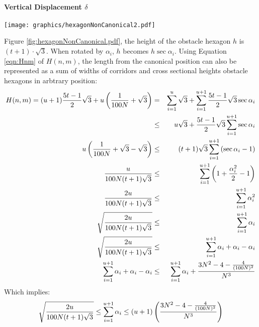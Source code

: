 \paragraph{Vertical Displacement $\delta$}
\begin{minipage}{\linewidth}
\begin{center}
\texttt{[image: graphics/hexagonNonCanonical2.pdf]}
\label{fig:hexagonNonCanonical.pdf}
\end{center}
\end{minipage}

Figure \ref{fig:hexagonNonCanonical.pdf}, the height of the obstacle hexagon $h$ is $(t+1) \cdot \sqrt{3}$.  
When rotated by $\alpha_i$, $h$ becomes $h \sec \alpha_i$.
Using Equation \ref{eqn:Hnm} of $H(n,m)$, the length from the canonical position can also be represented as a sum of widths of corridors and cross sectional heights obstacle hexagons in arbtrary position:
\begin{eqnarray*}
H(n,m) = (u+1) \frac{5t-1}{2} \sqrt{3} + u \left( \frac{1}{100N} + \sqrt{3} \right)&=& \sum_{i=1}^{u} \sqrt{3} + \sum_{i=1}^{u+1} \frac{5t-1}{2}\sqrt{3} \sec \alpha_i \\ 
&\leq& u \sqrt{3} + \frac{5t-1}{2} \sqrt{3} \sum_{i = 1}^{u+1} \sec \alpha_i\\
u \left( \frac{1}{100N} + \sqrt{3} - \sqrt{3}  \right) &\leq&(t+1) \sqrt{3}    \sum_{i = 1}^{u+1}  \left( \sec \alpha_i - 1 \right)\\
\frac{u}{100N(t+1)\sqrt{3}}&\leq& \sum_{i = 1}^{u+1} \left( 1 + \frac{\alpha_i^2}{2} - 1 \right)\\
\frac{2u}{100N(t+1)\sqrt{3}}&\leq& \sum_{i = 1}^{u+1} \alpha_i^2\\
\sqrt{\frac{2u}{100N(t+1)\sqrt{3}}} &\leq& \sum_{i=1}^{u+1} \alpha_i\\
\sqrt{\frac{2u}{100N(t+1)\sqrt{3}}} &\leq& \sum_{i=1}^{u+1} \alpha_i + \alpha_i - \alpha_i\\
\sum_{i=1}^{u+1} \alpha_i + \alpha_i - \alpha_i &\leq& \sum_{i=1}^{u+1} \alpha_i + \frac{3N^2 - 4 - \frac{4}{(100N)^2}}{N^3}
\end{eqnarray*}
Which implies:
$$\sqrt{\frac{2u}{100N(t+1)\sqrt{3}}} \leq \sum_{i=1}^{u+1} \alpha_i  \leq (u+1) \left( \frac{3N^2 - 4 - \frac{4}{(100N)^2}}{N^3} \right)$$
